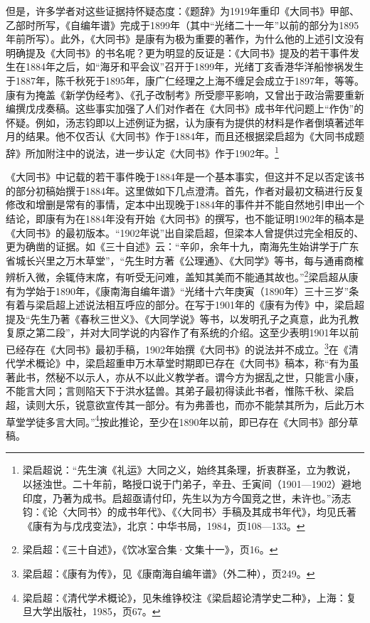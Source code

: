 \documentclass[a4paper, 12pt, openright]{ctexbook}
\begin{document}
但是，许多学者对这些证据持怀疑态度：《题辞》为1919年重印《大同书》甲部、乙部时所写，《自编年谱》完成于1899年（其中“光绪二十一年”以前的部分为1895年前所写）。此外，《大同书》是康有为极为重要的著作，为什么他的上述引文没有明确提及《大同书》的书名呢？更为明显的反证是：《大同书》提及的若干事件发生在1884年之后，如“海牙和平会议”召开于1899年，光绪丁亥香港华洋船惨祸发生于1887年，陈千秋死于1895年，康广仁经理之上海不缠足会成立于1897年，等等。康有为掩盖《新学伪经考》、《孔子改制考》所受廖平影响，又曾出于政治需要重新编撰戊戌奏稿。这些事实加强了人们对作者在《大同书》成书年代问题上“作伪”的怀疑。例如，汤志钧即以上述例证为据，认为康有为提供的材料是作者倒填著述年月的结果。他不仅否认《大同书》作于1884年，而且还根据梁启超为《大同书成题辞》所加附注中的说法，进一步认定《大同书》作于1902年。\footnote{梁启超说：“先生演《礼运》大同之义，始终其条理，折衷群圣，立为教说，以拯浊世。二十年前，略授口说于门弟子，辛丑、壬寅间（1901—1902）避地印度，乃著为成书。启超亟请付印，先生以为方今国竞之世，未许也。”汤志钧：《论〈大同书〉的成书年代》、《〈大同书〉手稿及其成书年代》，均见氏著《康有为与戊戌变法》，北京：中华书局，1984，页108—133。}

《大同书》中记载的若干事件晚于1884年是一个基本事实，但这并不足以否定该书的部分初稿始撰于1884年。这里做如下几点澄清。首先，作者对最初文稿进行反复修改和增删是常有的事情，定本中出现晚于1884年的事件并不能自然地引申出一个结论，即康有为在1884年没有开始《大同书》的撰写，也不能证明1902年的稿本是《大同书》的最初版本。“1902年说”出自梁启超，但梁本人曾提供过完全相反的、更为确凿的证据。如《三十自述》云：“辛卯，余年十九，南海先生始讲学于广东省城长兴里之万木草堂”，“先生时方著《公理通》、《大同学》等书，每与通甫商榷辨析入微，余辄侍末席，有听受无问难，盖知其美而不能通其故也。”\footnote{梁启超：《三十自述》，《饮冰室合集·文集十一》，页16。}梁启超从康有为学始于1890年，《康南海自编年谱》“光绪十六年庚寅（1890年）三十三岁”条有着与梁启超上述说法相互呼应的部分。在写于1901年的《康有为传》中，梁启超提及“先生乃著《春秋三世义》、《大同学说》等书，以发明孔子之真意，此为孔教复原之第二段”，并对大同学说的内容作了有系统的介绍。这至少表明1901年以前已经存在《大同书》最初手稿，1902年始撰《大同书》的说法并不成立。\footnote{梁启超：《康有为传》，见《康南海自编年谱》（外二种），页249。}在《清代学术概论》中，梁启超重申万木草堂时期即已存在《大同书》稿本，称“有为虽著此书，然秘不以示人，亦从不以此义教学者。谓今方为据乱之世，只能言小康，不能言大同；言则陷天下于洪水猛兽。其弟子最初得读此书者，惟陈千秋、梁启超，读则大乐，锐意欲宣传其一部分。有为弗善也，而亦不能禁其所为，后此万木草堂学徒多言大同。”\footnote{梁启超：《清代学术概论》，见朱维铮校注《梁启超论清学史二种》，上海：复旦大学出版社，1985，页67。}按此推论，至少在1890年以前，即已存在《大同书》部分草稿。
\end{document}
